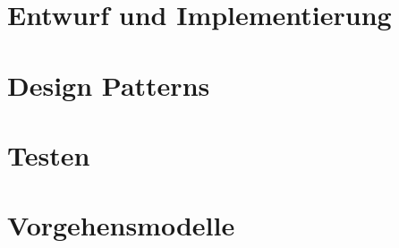 \documentclass[11pt, a4paper]{article}
\begin{document}
\section{Entwurf und Implementierung} %


\section{Design Patterns} %


\section{Testen} %


\section{Vorgehensmodelle} %
\end{document}
